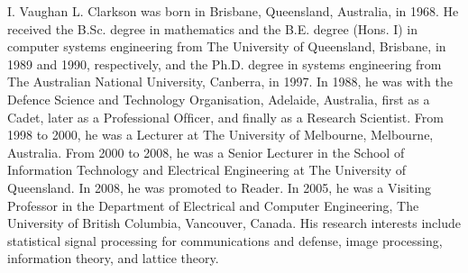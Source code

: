 \documentclass[journal]{IEEEtran}
\begin{document}
\begin{IEEEbiographynophoto}{I. Vaughan L. Clarkson}
was born in Brisbane,
Queensland, Australia, in 1968. He received the
B.Sc. degree in mathematics and the B.E. degree
(Hons. I) in computer systems engineering from
The University of Queensland, Brisbane, in 1989
and 1990, respectively, and the Ph.D. degree in
systems engineering from The Australian National
University, Canberra, in 1997.
In 1988, he was with the Defence Science and
Technology Organisation, Adelaide, Australia, ﬁrst
as a Cadet, later as a Professional Ofﬁcer, and ﬁnally
as a Research Scientist. From 1998 to 2000, he was a Lecturer at The University
of Melbourne, Melbourne, Australia. From 2000 to 2008, he was a Senior
Lecturer in the School of Information Technology and Electrical Engineering
at The University of Queensland. In 2008, he was promoted to Reader. In 2005,
he was a Visiting Professor in the Department of Electrical and Computer
Engineering, The University of British Columbia, Vancouver, Canada. His
research interests include statistical signal processing for communications and
defense, image processing, information theory, and lattice theory.
\end{IEEEbiographynophoto}
\end{document}
